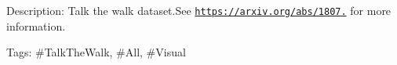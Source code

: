 Description\+: Talk the walk dataset.\+See \href{https://arxiv.org/abs/1807.03367}{\tt https\+://arxiv.\+org/abs/1807.} for more information.

Tags\+: \#\+Talk\+The\+Walk, \#\+All, \#\+Visual 